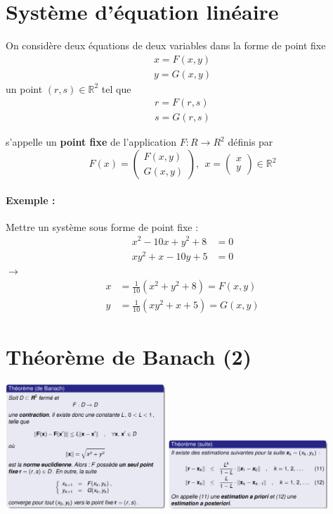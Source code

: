 \documentclass[a4paper,9pt]{extarticle}
\begin{document}
\begin{multicols*}{2}
\section{Système d'équation linéaire}

On considère deux équations de deux variables dans la forme de point fixe
\begin{align*}
x=F(x,y)\\
y=G(x,y)
\end{align*}
un point $(r,s)\in \mathbb{R}^2$ tel que
\begin{align*}
r = F(r,s)\\
s = G(r,s)
\end{align*}

s'appelle un \textbf{point fixe} de l'application $F:R\rightarrow R^2$ définis par $$
F(x)=\begin{pmatrix} F(x,y)\\G(x,y)\end{pmatrix},\ \ x=\begin{pmatrix} x\\y\end{pmatrix} \in \mathbb{R}^2
$$

\paragraph*{Exemple :} Mettre un système sous forme de point fixe :
\begin{align*}
x^2-10x+y^2+8&=0\\
xy^2+x-10y+5&=0
\end{align*}
$\longrightarrow$
\begin{align*}
x &= \frac{1}{10}(x^2+y^2+8)=F(x,y)\\
y &= \frac{1}{10}(xy^2+x+5)=G(x,y)
\end{align*}

\section{Théorème de Banach (2)}

\begin{center}
    \includegraphics[width=0.45\textwidth]{img/banach_2.png}
    \includegraphics[width=0.45\textwidth]{img/banach_2_2.png}
\end{center}



\end{multicols*}
\end{document}
